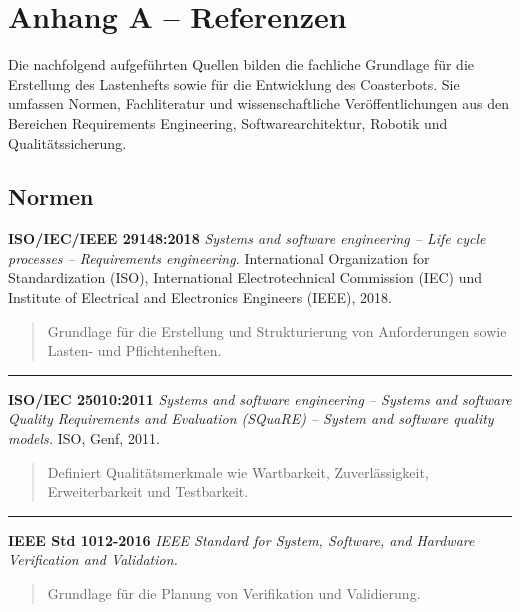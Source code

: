\documentclass[
  a4paper,
  12pt,
  DIV=12,        %
  parskip=half,  %
  headings=small %
]{scrartcl}
\theoremstyle{definition}
\theoremstyle{definition}
\begin{document}
\section{Anhang A -- Referenzen}\label{anhang-a-referenzen}

Die nachfolgend aufgeführten Quellen bilden die fachliche Grundlage für
die Erstellung des Lastenhefts sowie für die Entwicklung des
Coasterbots. Sie umfassen Normen, Fachliteratur und wissenschaftliche
Veröffentlichungen aus den Bereichen Requirements Engineering,
Softwarearchitektur, Robotik und Qualitätssicherung.

\subsection{Normen}\label{normen}

\textbf{ISO/IEC/IEEE 29148:2018} \emph{Systems and software engineering
-- Life cycle processes -- Requirements engineering.} International
Organization for Standardization (ISO), International Electrotechnical
Commission (IEC) und Institute of Electrical and Electronics Engineers
(IEEE), 2018.

\begin{quote}
Grundlage für die Erstellung und Strukturierung von Anforderungen sowie
Lasten- und Pflichtenheften.
\end{quote}

\begin{center}\rule{0.5\linewidth}{0.5pt}\end{center}

\textbf{ISO/IEC 25010:2011} \emph{Systems and software engineering --
Systems and software Quality Requirements and Evaluation (SQuaRE) --
System and software quality models.} ISO, Genf, 2011.

\begin{quote}
Definiert Qualitätsmerkmale wie Wartbarkeit, Zuverlässigkeit,
Erweiterbarkeit und Testbarkeit.
\end{quote}

\begin{center}\rule{0.5\linewidth}{0.5pt}\end{center}

\textbf{IEEE Std 1012-2016} \emph{IEEE Standard for System, Software,
and Hardware Verification and Validation.}

\begin{quote}
Grundlage für die Planung von Verifikation und Validierung.
\end{quote}
\end{document}

